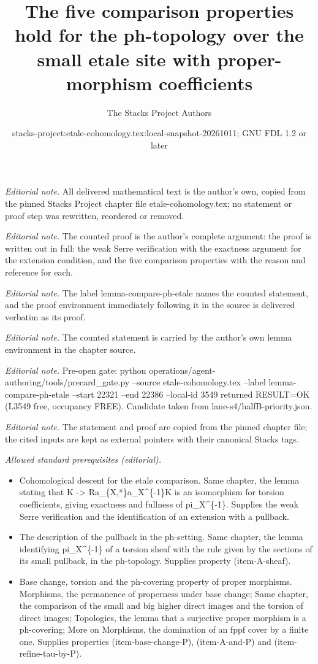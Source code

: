 \documentclass[10pt,a4paper]{amsart}
\title{The five comparison properties hold for the ph-topology over the small etale site with proper-morphism coefficients}
\author{The Stacks Project Authors}
\date{stacks-project:etale-cohomology.tex:local-snapshot-20261011; GNU FDL 1.2 or later}
\theoremstyle{plain}
\theoremstyle{definition}
\theoremstyle{remark}
\numberwithin{equation}{subsection}
\begin{document}
\maketitle
\noindent\textit{Editorial note.} All delivered mathematical text is the author's own, copied from the pinned Stacks Project chapter file etale-cohomology.tex; no statement or proof step was rewritten, reordered or removed.\par\medskip
\noindent\textit{Editorial note.} The counted proof is the author's complete argument: the proof is written out in full: the weak Serre verification with the exactness argument for the extension condition, and the five comparison properties with the reason and reference for each.\par\medskip
\noindent\textit{Editorial note.} The label lemma-compare-ph-etale names the counted statement, and the proof environment immediately following it in the source is delivered verbatim as its proof.\par\medskip
\noindent\textit{Editorial note.} The counted statement is carried by the author's own lemma environment in the chapter source.\par\medskip
\noindent\textit{Editorial note.} Pre-open gate: python operations/agent-authoring/tools/precard\_gate.py --source etale-cohomology.tex --label lemma-compare-ph-etale --start 22321 --end 22386 --local-id 3549 returned RESULT=OK (L3549 free, occupancy FREE). Candidate taken from lane-s4/halfB-priority.json.\par\medskip
\noindent\textit{Editorial note.} The statement and proof are copied from the pinned chapter file; the cited inputs are kept as external pointers with their canonical Stacks tags.\par\medskip
\noindent\textit{Allowed standard prerequisites (editorial).}\begin{itemize}
\item Cohomological descent for the etale comparison. Same chapter, the lemma stating that K -> Ra\_\{X,*\}a\_X\textasciicircum{}\{-1\}K is an isomorphism for torsion coefficients, giving exactness and fullness of pi\_X\textasciicircum{}\{-1\}. Supplies the weak Serre verification and the identification of an extension with a pullback.
\item The description of the pullback in the ph-setting. Same chapter, the lemma identifying pi\_X\textasciicircum{}\{-1\} of a torsion sheaf with the rule given by the sections of its small pullback, in the ph-topology. Supplies property (item-A-sheaf).
\item Base change, torsion and the ph-covering property of proper morphisms. Morphisms, the permanence of properness under base change; Same chapter, the comparison of the small and big higher direct images and the torsion of direct images; Topologies, the lemma that a surjective proper morphism is a ph-covering; More on Morphisms, the domination of an fppf cover by a finite one. Supplies properties (item-base-change-P), (item-A-and-P) and (item-refine-tau-by-P).
\end{itemize}\medskip
\end{document}
